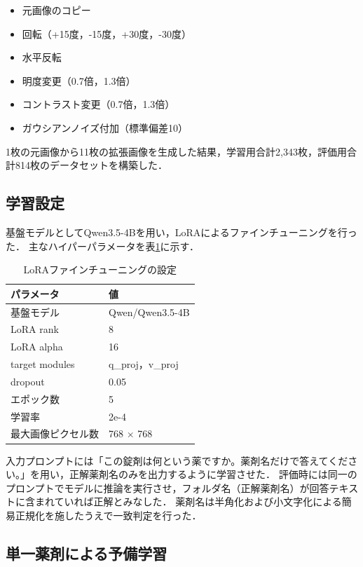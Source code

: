 \documentclass{ltjsarticle}
\begin{document}
\begin{itemize}
  \item 元画像のコピー
  \item 回転（+15度，-15度，+30度，-30度）
  \item 水平反転
  \item 明度変更（0.7倍，1.3倍）
  \item コントラスト変更（0.7倍，1.3倍）
  \item ガウシアンノイズ付加（標準偏差10）
\end{itemize}

1枚の元画像から11枚の拡張画像を生成した結果，学習用合計2,343枚，評価用合計814枚のデータセットを構築した．

\subsection{学習設定}

基盤モデルとしてQwen3.5-4Bを用い，LoRAによるファインチューニングを行った．
主なハイパーパラメータを表\ref{tab:lora_config}に示す．

\begin{table}[h]
\centering
\caption{LoRAファインチューニングの設定}
\label{tab:lora_config}
\begin{tabular}{ll}
\hline
パラメータ & 値 \\
\hline
基盤モデル & Qwen/Qwen3.5-4B \\
LoRA rank & 8 \\
LoRA alpha & 16 \\
target modules & q\_proj，v\_proj \\
dropout & 0.05 \\
エポック数 & 5 \\
学習率 & 2e-4 \\
最大画像ピクセル数 & 768 $\times$ 768 \\
\hline
\end{tabular}
\end{table}

入力プロンプトには「この錠剤は何という薬ですか。薬剤名だけで答えてください。」を用い，正解薬剤名のみを出力するように学習させた．
評価時には同一のプロンプトでモデルに推論を実行させ，フォルダ名（正解薬剤名）が回答テキストに含まれていれば正解とみなした．
薬剤名は半角化および小文字化による簡易正規化を施したうえで一致判定を行った．

\subsection{単一薬剤による予備学習}
\end{document}
